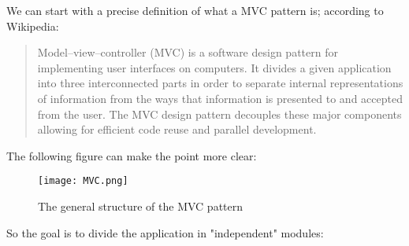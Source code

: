 We can start with a precise definition of what a MVC pattern is; according to Wikipedia:

\begin{quote} 

Model–view–controller (MVC) is a software design pattern for implementing user interfaces on computers. It divides a given application into three interconnected parts in order to separate internal representations of information from the ways that information is presented to and accepted from the user. The MVC design pattern decouples these major components allowing for efficient code reuse and parallel development.

\end{quote}

The following figure can make the point more clear:

\begin{figure}[H]
\centering
\texttt{[image: MVC.png]}  
\caption{The general structure of the MVC pattern}
\end{figure}    

So the goal is to divide the application in "independent" modules:

